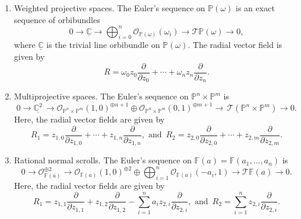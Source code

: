 \documentclass[11pt]{amsart}
\theoremstyle{plain}
\theoremstyle{definition}
\begin{document}
\begin{enumerate}
	\item Weighted projective spaces.
The Euler's sequence on $\mathbb{P}(\omega)$ is an exact sequence of orbibundles
$$
0\longrightarrow
\underline{\mathbb{C}}\longrightarrow\bigoplus_{i=0}^{n
}\mathcal{O}_{\mathbb{P}(\omega)}(\omega_i) \longrightarrow
\mathcal{T}\mathbb{P}(\omega) \longrightarrow 0,
$$
where $\underline{\mathbb{C}}$ is the trivial line orbibundle on
$\mathbb{P}(\omega)$. The radial vector field is given by
$$R = \omega_0 z_0 \frac{\partial}{\partial z_0}+\cdots+ \omega_n z_n \frac{\partial}{\partial z_n}.$$
 \item Multiprojective spaces. The Euler's sequence on $\mathbb{P}^{n}\times\mathbb{P}^{m}$ is
$$0\longrightarrow \underline{\mathbb{C}^{2}}\,
{\longrightarrow}
\mathcal{O}_{\mathbb{P}^{n}\times\mathbb{P}^{m}}(1,0)^{\oplus n+1}\oplus\mathcal{O}_{\mathbb{P}^{n}\times\mathbb{P}^{m}}(0,1)^{\oplus m+1}
{\longrightarrow}\,
\mathcal{T}(\mathbb{P}^{n}\times\mathbb{P}^{m})
\longrightarrow 0.$$
Here, the radial vector fields are given by
$$R_1 = z_{1,0} \frac{\partial}{\partial z_{1,0}}+\cdots+ z_{1,n} \frac{\partial}{\partial z_{1,n}},\,\,\mbox{and}\,\,\,
R_2 = z_{2,0} \frac{\partial}{\partial z_{2,0}}+\cdots+ z_{2,m} \frac{\partial}{\partial z_{2,m}}.$$

 \item Rational normal scrolls. The Euler's sequence on $\mathbb{F}(a)=\mathbb{F}(a_1,\dots,a_n)$ is
$$0 \rightarrow\mathcal{O}_{\mathbb{F}(a)}^{\oplus
2}\rightarrow\mathcal{O}_{\mathbb{F}(a)}(1,0)^{\oplus 2}\oplus\bigoplus_{i=1}^n
\mathcal{O}_{\mathbb{F}(a)}(-a_i,1)\rightarrow \mathcal{T}\mathbb{F}(a)\rightarrow0.$$
Here, the radial vector fields are given by
$$R_1 = z_{1,1}\frac{\partial}{\partial z_{1,1}}+ z_{1,2}\frac{\partial}{\partial z_{1,2}} 
- \sum_{i=1}^{n}a_i z_{2,i}\frac{\partial}{\partial z_{2,i}},\,\,\mbox{and}\,\,\, 
R_2 = \sum_{i=1}^{n}z_{2,i}\frac{\partial}{\partial z_{2,i}}.$$
 \end{enumerate}

\bigskip
\end{document}

